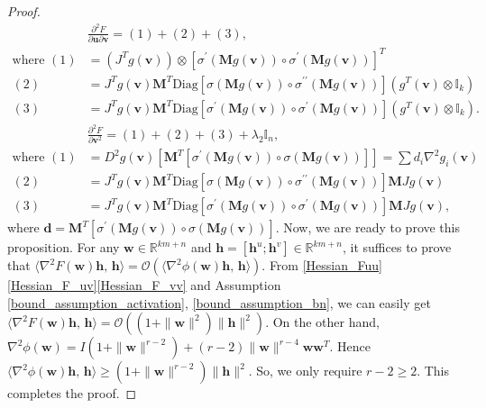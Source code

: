 \documentclass[twoside,11pt]{article}
\newcommand{\be}{\begin{equation}}
\newcommand{\ee}{\end{equation}}
\newcommand{\R}{\mathbb R}
\def\inprod#1#2{\langle#1,\,#2\rangle}
\def\vd{{\bm{d}}}
\def\vh{{\bm{h}}}
\def\vu{{\bm{u}}}
\def\vv{{\bm{v}}}
\def\vw{{\bm{w}}}
\def\mM{{\bm{M}}}
\begin{document}
\begin{proof}
\be 
\begin{aligned}
&\frac{\partial^2F}{\partial\vu\partial\vv}=(1)+(2)+(3),\\
\text{where }(1)&=\left(J^Tg(\vv)\right)\otimes\left[\sigma^\prime(\mM g(\vv))\circ\sigma^{\prime}(\mM g(\vv))\right]^T\\
(2)&=J^Tg(\vv)\mM^T\text{Diag}[\sigma(\mM g(\vv))\circ\sigma^{\prime\prime}(\mM g(\vv))]\left(g^T(\vv)\otimes\mathbb I_k\right)\\
(3)&=J^Tg(\vv)\mM^T\text{Diag}[\sigma^\prime(\mM g(\vv))\circ\sigma^{\prime}(\mM g(\vv))]\left(g^T(\vv)\otimes\mathbb I_k\right).
\end{aligned}
\label{Hessian_F_uv}
\ee 
\be 
\begin{aligned}
&\frac{\partial^2F}{\partial\vv^2}=(1)+(2)+(3)+\lambda_2\mathbb{I}_{n},\\
\text{where }(1)&=D^2g(\vv)\left[\mM^T[\sigma^\prime(\mM g(\vv))\circ\sigma(\mM g(\vv))]\right]=\sum d_i\nabla^2g_i(\vv)\\
(2)&=J^Tg(\vv)\mM^T\text{Diag}[\sigma(\mM g(\vv))\circ\sigma^{\prime\prime}(\mM g(\vv))]\mM Jg(\vv)\\
(3)&=J^Tg(\vv)\mM^T\text{Diag}[\sigma^\prime(\mM g(\vv))\circ\sigma^{\prime}(\mM g(\vv))]\mM Jg(\vv),
\end{aligned}
\label{Hessian_F_vv}
\ee 
where $\vd=\mM^T[\sigma^\prime(\mM g(\vv))\circ\sigma(\mM g(\vv))]$. Now, we are ready to prove this proposition. For any $\vw\in\R^{km+n}$ and $\vh=[\vh^u;\vh^v]\in\R^{km+n}$, it suffices to prove that $\inprod{\nabla^2F(\vw)\vh}{\vh}=\mathcal O(\inprod{\nabla^2\phi(\vw)\vh}{\vh})$. From \eqref{Hessian_Fuu}\eqref{Hessian_F_uv}\eqref{Hessian_F_vv} and Assumption \ref{bound_assumption_activation}, \ref{bound_assumption_bn}, we can easily get $\inprod{\nabla^2F(\vw)\vh}{\vh}=\mathcal O((1+\|\vw\|^2)\|\vh\|^2)$. On the other hand, $\nabla^2\phi(\vw)=I(1+\|\vw\|^{r-2})+(r-2)\|\vw\|^{r-4}\vw\vw^T$. Hence $\inprod{\nabla^2\phi(\vw)\vh}{\vh}\geq(1+\|\vw\|^{r-2})\|\vh\|^2$. So, we only require $r-2\geq2$. This completes the proof.   
\end{proof}
\end{document}
